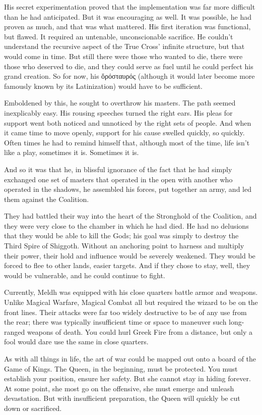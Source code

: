 His secret experimentation proved that the implementation was far more difficult than he had anticipated. But it was encouraging as well. It was possible, he had proven as much, and that was what mattered. His first iteration was functional, but flawed. It required an untenable, unconscionable sacrifice. He couldn’t understand the recursive aspect of the True Cross’ infinite structure, but that would come in time. But still there were those who wanted to die, there were those who deserved to die, and they could serve as fuel until he could perfect his grand creation. So for now, his ὅρόσταυρός (although it would later become more famously known by its Latinization) would have to be sufficient.

Emboldened by this, he sought to overthrow his masters. The path seemed inexplicably easy. His rousing speeches turned the right ears. His pleas for support went both noticed and unnoticed by the right sets of people. And when it came time to move openly, support for his cause swelled quickly, so quickly. Often times he had to remind himself that, although most of the time, life isn’t like a play, sometimes it is. Sometimes it is.

And so it was that he, in blissful ignorance of the fact that he had simply exchanged one set of masters that operated in the open with another who operated in the shadows, he assembled his forces, put together an army, and led them against the Coalition.

They had battled their way into the heart of the Stronghold of the Coalition, and they were very close to the chamber in which he had died. He had no delusions that they would be able to kill the Gods; his goal was simply to destroy the Third Spire of Shiggoth. Without an anchoring point to harness and multiply their power, their hold and influence would be severely weakened. They would be forced to flee to other lands, easier targets. And if they chose to stay, well, they would be vulnerable, and he could continue to fight.

Currently, Meldh was equipped with his close quarters battle armor and weapons. Unlike Magical Warfare, Magical Combat all but required the wizard to be on the front lines. Their attacks were far too widely destructive to be of any use from the rear; there was typically insufficient time or space to maneuver such long-ranged weapons of death. You could hurl Greek Fire from a distance, but only a fool would dare use the same in close quarters.

As with all things in life, the art of war could be mapped out onto a board of the Game of Kings. The Queen, in the beginning, must be protected. You must establish your position, ensure her safety. But she cannot stay in hiding forever. At some point, she most go on the offensive, she must emerge and unleash devastation. But with insufficient preparation, the Queen will quickly be cut down or sacrificed.

